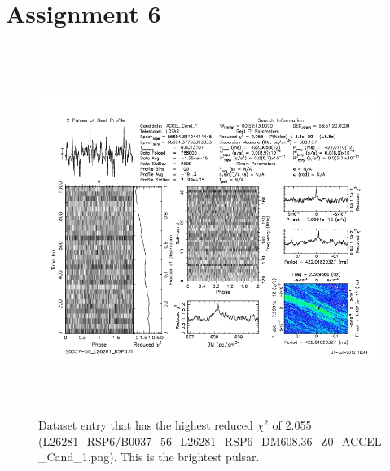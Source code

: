 \documentclass[a4paper]{article}
\begin{document}
\section*{Assignment 6}
\begin{figure}[h!] 
\begin{center} 
\includegraphics[height=12cm]{Brightest.png} 
\caption{Dataset entry that has the highest reduced $\chi^2$ of 2.055 (L26281\_RSP6/B0037+56\_L26281\_RSP6\_DM608.36\_Z0\_ACCEL\_Cand\_1.png). This is the brightest pulsar.}
\label{fig:brightest} 
\end{center} 
\end{figure} 

\newpage
\end{document}

